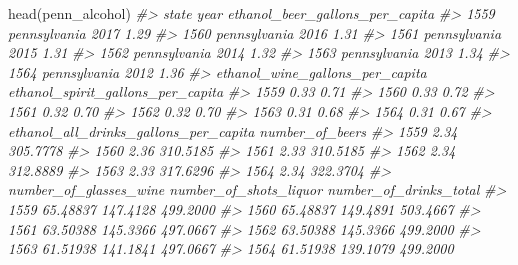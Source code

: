 \documentclass[
]{krantz}
\makeatletter
\newenvironment{Shaded}{\begin{snugshade}}{\end{snugshade}}
\newcommand{\CommentTok}[1]{\textcolor[rgb]{0.37,0.37,0.37}{\textit{#1}}}
\newcommand{\FunctionTok}[1]{\textcolor[rgb]{0,0,0}{#1}}
\newcommand{\NormalTok}[1]{#1}
\newenvironment{kframe}{%
\medskip{}
\setlength{\fboxsep}{.8em}
 \def\at@end@of@kframe{}%
 \ifinner\ifhmode%
  \def\at@end@of@kframe{\end{minipage}}%
  \begin{minipage}{\columnwidth}%
 \fi\fi%
 \def\FrameCommand##1{\hskip\@totalleftmargin \hskip-\fboxsep
 \colorbox{shadecolor}{##1}\hskip-\fboxsep
     \hskip-\linewidth \hskip-\@totalleftmargin \hskip\columnwidth}%
 \MakeFramed {\advance\hsize-\width
   \@totalleftmargin\z@ \linewidth\hsize
   \@setminipage}}%
 {\par\unskip\endMakeFramed%
 \at@end@of@kframe}
\renewenvironment{Shaded}{\begin{kframe}}{\end{kframe}}
\makeatother
\begin{document}
\begin{Shaded}
\begin{Highlighting}[]
\FunctionTok{head}\NormalTok{(penn\_alcohol)}
\CommentTok{\#\textgreater{}             state year ethanol\_beer\_gallons\_per\_capita}
\CommentTok{\#\textgreater{} 1559 pennsylvania 2017                            1.29}
\CommentTok{\#\textgreater{} 1560 pennsylvania 2016                            1.31}
\CommentTok{\#\textgreater{} 1561 pennsylvania 2015                            1.31}
\CommentTok{\#\textgreater{} 1562 pennsylvania 2014                            1.32}
\CommentTok{\#\textgreater{} 1563 pennsylvania 2013                            1.34}
\CommentTok{\#\textgreater{} 1564 pennsylvania 2012                            1.36}
\CommentTok{\#\textgreater{}      ethanol\_wine\_gallons\_per\_capita ethanol\_spirit\_gallons\_per\_capita}
\CommentTok{\#\textgreater{} 1559                            0.33                              0.71}
\CommentTok{\#\textgreater{} 1560                            0.33                              0.72}
\CommentTok{\#\textgreater{} 1561                            0.32                              0.70}
\CommentTok{\#\textgreater{} 1562                            0.32                              0.70}
\CommentTok{\#\textgreater{} 1563                            0.31                              0.68}
\CommentTok{\#\textgreater{} 1564                            0.31                              0.67}
\CommentTok{\#\textgreater{}      ethanol\_all\_drinks\_gallons\_per\_capita number\_of\_beers}
\CommentTok{\#\textgreater{} 1559                                  2.34        305.7778}
\CommentTok{\#\textgreater{} 1560                                  2.36        310.5185}
\CommentTok{\#\textgreater{} 1561                                  2.33        310.5185}
\CommentTok{\#\textgreater{} 1562                                  2.34        312.8889}
\CommentTok{\#\textgreater{} 1563                                  2.33        317.6296}
\CommentTok{\#\textgreater{} 1564                                  2.34        322.3704}
\CommentTok{\#\textgreater{}      number\_of\_glasses\_wine number\_of\_shots\_liquor number\_of\_drinks\_total}
\CommentTok{\#\textgreater{} 1559               65.48837               147.4128               499.2000}
\CommentTok{\#\textgreater{} 1560               65.48837               149.4891               503.4667}
\CommentTok{\#\textgreater{} 1561               63.50388               145.3366               497.0667}
\CommentTok{\#\textgreater{} 1562               63.50388               145.3366               499.2000}
\CommentTok{\#\textgreater{} 1563               61.51938               141.1841               497.0667}
\CommentTok{\#\textgreater{} 1564               61.51938               139.1079               499.2000}
\end{Highlighting}
\end{Shaded}
\end{document}
